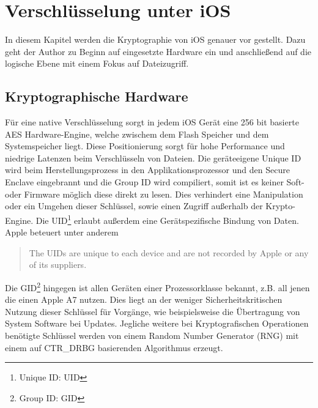 \section{Verschlüsselung unter iOS}
	In diesem Kapitel werden die Kryptographie von iOS genauer vor gestellt.
	Dazu geht der Author zu Beginn auf eingesetzte Hardware ein und anschließend
	auf die logische Ebene mit einem Fokus auf Dateizugriff.
	\subsection{Kryptographische Hardware}\label{sec:crypto-engine}
		Für eine native Verschlüsselung sorgt in jedem iOS Gerät eine 256 bit
		basierte AES Hardware-Engine, welche zwischem dem Flash	Speicher und dem
		Systemspeicher liegt. Diese Positionierung sorgt für hohe Performance und
		niedrige Latenzen beim Verschlüsseln von Dateien. Die geräteeigene Unique ID
		wird beim Herstellungsprozess in den Applikationsprozessor und den Secure
		Enclave eingebrannt und die Group ID wird compiliert, somit ist es keiner
		Soft- oder Firmware möglich diese direkt zu lesen. Dies verhindert eine
		Manipulation oder ein Umgehen dieser Schlüssel, sowie einen Zugriff außerhalb
		der Krypto-Engine. Die UID\footnote{Unique ID: UID} erlaubt außerdem eine
		Gerätspezifische Bindung von Daten. Apple beteuert unter anderem
		\begin{quote}
			The UIDs are unique to each device and are not recorded by Apple or any of its
			suppliers.\cite[S.9]{iOSSecurityApr2015}
		\end{quote}
		Die GID\footnote{Group ID: GID} hingegen ist allen Geräten einer
		Prozessorklasse bekannt, z.B.
		all jenen die einen Apple A7 nutzen. Dies liegt an der weniger
		Sicherheitskritischen Nutzung dieser Schlüssel für Vorgänge,
		wie beispielsweise die Übertragung von System Software bei Updates. Jegliche
		weitere bei Kryptografischen Operationen benötigte Schlüssel werden von einem
		Random Number Generator (RNG) mit einem auf	CTR\_DRBG\cite{NISTDRBG2012}
		basierenden Algorithmus erzeugt.
